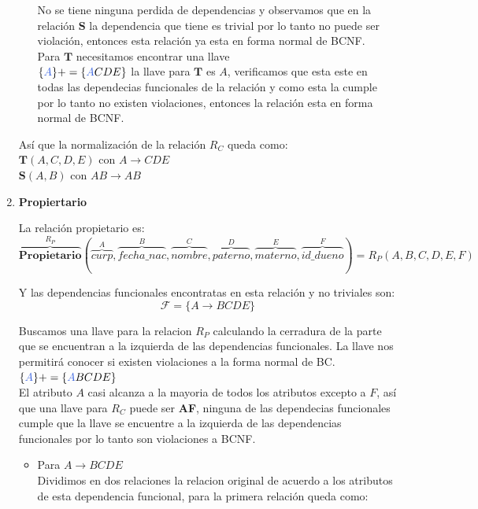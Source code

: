 \documentclass[10pt]{article}
\begin{document}
\begin{enumerate}
\begin{itemize}
    		No se tiene ninguna perdida de dependencias y observamos que en la relación
    		$\textbf{S}$ la dependencia que tiene es trivial por lo tanto no puede ser violación, entonces esta relación ya esta en forma normal de BCNF. \\
    		Para $\textbf{T}$  necesitamos encontrar una llave\\
    		$\{\textcolor{RoyalBlue}{A}\}+= \{\textcolor{RoyalBlue}{A}CDE\}$ la llave para $\textbf{T}$ es $A$, verificamos que esta este en todas las dependecias funcionales de la relación y como esta la cumple por lo tanto no existen violaciones, entonces la relación esta en forma normal de BCNF.\\
    	\end{itemize}
    
    Así que la normalización de la relación $R_C$ queda como:\\
    
    $\textbf{T}(A,C,D,E)$ con $A \rightarrow CDE$\\   
    $\textbf{S}(A,B)$ con $AB \rightarrow AB$\\
    
    
    \item \textbf{Propiertario}
    
    La relación propietario es:
    \[\overbrace{{\textbf{Propietario}}}^{\textbf{$R_{P}$}} 
    (
    \overbrace{curp}^{A}, \overbrace{fecha\_nac}^{B}, \overbrace{nombre}^{C}, \overbrace{paterno}^{D}, \overbrace{materno}^{E}, \overbrace{id\_dueno}^{F}
    )
    = 
    \textbf{$R_P$}(A,B,C,D,E,F)
    \]
    
    Y las dependencias funcionales encontratas en esta relación  y no triviales son:\\
    \[\mathcal{F} = \{A \rightarrow BCDE\}\]
    
    Buscamos una llave para la relacion $R_P$ calculando la cerradura de la parte que se encuentran a la izquierda de las dependencias funcionales. La llave nos permitirá conocer si existen violaciones a la forma normal de BC.\\
    
    $\{\textcolor{RoyalBlue}{A}\}+= \{\textcolor{RoyalBlue}{A}BCDE\}$\\
    
    El atributo $A$ casi alcanza a la mayoria de todos los atributos excepto a $F$, así que una llave para $R_C$ puede ser \textbf{AF}, ninguna de las dependecias funcionales cumple que la llave se encuentre a la izquierda de las dependencias funcionales por lo tanto son violaciones a BCNF.\\
    \begin{itemize}
    	\item Para $A \rightarrow BCDE$\\
    	Dividimos en dos relaciones la relacion original de acuerdo a los atributos de esta dependencia funcional, para la primera relación queda como:\\
    	

\end{itemize}
\end{enumerate}
\end{document}
